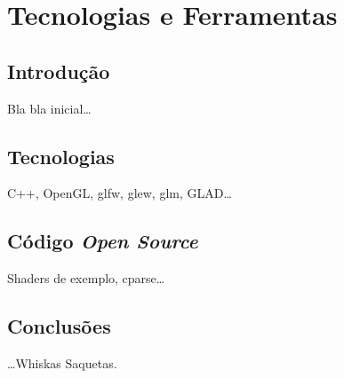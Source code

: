 \chapter{Tecnologias e Ferramentas}
\label{ch::tecno}

\section{Introdução}
\label{sec::tecno:intro}

Bla bla inicial\ldots


\section{Tecnologias}
\label{sec::tecno:tecno}

C++, OpenGL, glfw, glew, glm, GLAD\ldots


\section{Código \emph{Open Source}}
\label{sec::tecno:opensource}

Shaders de exemplo, cparse\ldots


\section{Conclusões}
\label{sec::tecno:conc}

\ldots Whiskas Saquetas.
